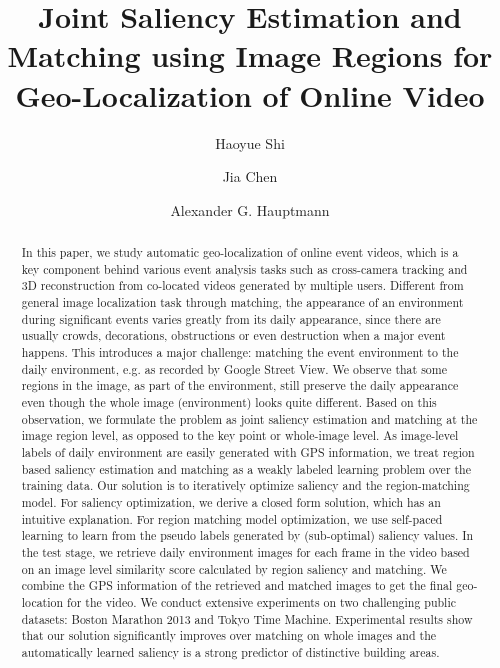 \documentclass[sigconf]{acmart}
\begin{document}
\title{Joint Saliency Estimation and Matching using Image Regions for Geo-Localization of Online Video}

\author{Haoyue Shi}

\author{Jia Chen}


\author{Alexander G. Hauptmann}
\renewcommand{\shorttitle}{JSEM using Image Regions for Geo-Localization for Online Video}


\begin{abstract}
In this paper, we study automatic geo-localization of online event videos, which is a key component behind various event analysis tasks such as cross-camera tracking and 3D reconstruction from co-located videos generated by multiple users. 
Different from general image localization task through matching, the appearance of an environment during significant events varies greatly from its daily appearance, since there are usually crowds, decorations, obstructions or even destruction when a major event happens. 
This introduces a major challenge: matching the event environment to the daily environment, e.g. as recorded by Google Street View. 
We observe that some regions in the image, as part of the environment, still preserve the daily appearance even though the whole image (environment) looks quite different. 
Based on this observation, we formulate the problem as joint saliency estimation and matching at the image region level, as opposed to the key point or whole-image level. 
As image-level labels of daily environment are easily generated with GPS information, we treat region based saliency estimation and matching as a weakly labeled learning problem over the training data. 
Our solution is to iteratively optimize saliency and the region-matching model. 
For saliency optimization, we derive a closed form solution, which has an intuitive explanation. 
For region matching model optimization, we use self-paced learning to learn from the pseudo labels generated by (sub-optimal) saliency values. 
In the test stage, we retrieve daily environment images for each frame in the video based on an image level similarity score calculated by region saliency and matching. 
We combine the GPS information of the retrieved and matched images to get the final geo-location for the video. 
We conduct extensive experiments on two challenging public datasets: Boston Marathon 2013 and Tokyo Time Machine. 
Experimental results show that our solution significantly improves over matching on whole images and the automatically learned saliency is a strong predictor of distinctive building areas. 
\end{abstract}
\end{document}
